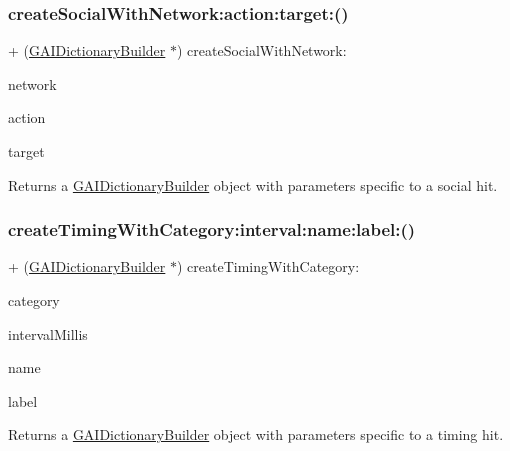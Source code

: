 \subsubsection{\texorpdfstring{create\+Social\+With\+Network\+:action\+:target\+:()}{createSocialWithNetwork:action:target:()}}
{\footnotesize\ttfamily + (\hyperlink{interface_g_a_i_dictionary_builder}{G\+A\+I\+Dictionary\+Builder} $\ast$) create\+Social\+With\+Network\+: \begin{DoxyParamCaption}\item[{(N\+S\+String $\ast$)}]{network }\item[{action:(N\+S\+String $\ast$)}]{action }\item[{target:(N\+S\+String $\ast$)}]{target }\end{DoxyParamCaption}}

Returns a \hyperlink{interface_g_a_i_dictionary_builder}{G\+A\+I\+Dictionary\+Builder} object with parameters specific to a social hit. \mbox{\label{interface_g_a_i_dictionary_builder_a81744404c695f9906eaf6e99eb3ee498}} 
\subsubsection{\texorpdfstring{create\+Timing\+With\+Category\+:interval\+:name\+:label\+:()}{createTimingWithCategory:interval:name:label:()}}
{\footnotesize\ttfamily + (\hyperlink{interface_g_a_i_dictionary_builder}{G\+A\+I\+Dictionary\+Builder} $\ast$) create\+Timing\+With\+Category\+: \begin{DoxyParamCaption}\item[{(N\+S\+String $\ast$)}]{category }\item[{interval:(N\+S\+Number $\ast$)}]{interval\+Millis }\item[{name:(N\+S\+String $\ast$)}]{name }\item[{label:(N\+S\+String $\ast$)}]{label }\end{DoxyParamCaption}}

Returns a \hyperlink{interface_g_a_i_dictionary_builder}{G\+A\+I\+Dictionary\+Builder} object with parameters specific to a timing hit. \mbox{\label{interface_g_a_i_dictionary_builder_af4868766c2fa6c616082f1089057de8c}} 
